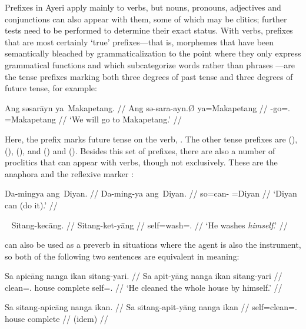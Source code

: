 Prefixes in Ayeri apply mainly to verbs, but nouns, pronouns, adjectives and 
conjunctions can also appear with them, some of which may be clitics; further 
tests need to be performed to determine their exact status.
With verbs, prefixes that are most certainly `true' prefixes---that is, 
morphemes that have been semantically bleached by grammaticalization to the 
point where they only express grammatical functions \citep[157ff.]{lehmann2015} 
and which subcategorize words rather than phrases 
\citep[117]{klavans1985}---are the tense prefixes marking both three degrees of 
past tense and three degrees of future tense, for example:

\ex\begingl
	\gla Ang səsarāyn ya~Makapetang. //
	\glb Ang sə-sara-ayn.Ø ya=Makapetang //
	\glc \AgtT{} \Fut{}-go=\Fpl{}.\Top{} \Loc{}=Makapetang //
	\glft `We will go to Makapetang.' //
\endgl\xe

Here, the prefix  marks future tense on the verb, 
. The other tense prefixes are  
(\NPst{}),  (\Pst{}),  (\RPst{}), and  
(\NFut{}) and  (\RFut{}). Besides this set of prefixes, there are 
also a number of proclitics that can appear with verbs, though not exclusively. 
These are the anaphora  and the 
reflexive marker :

\ex\begingl
	\gla Da-mingya ang~Diyan. //
	\glb Da-ming-ya ang~Diyan. //
	\glc so=can-\TsgM{} \Aarg{}=Diyan //
	\glft `Diyan can (do it).' //
\endgl
% 
\xe

\ex~\begingl
	\gla Sitang-kecāng. //
	\glb Sitang-ket-yāng //
	\glc self=wash=\TsgM{}.\Aarg{} //
	\glft `He washes \emph{himself}.' //
\endgl\xe

 can also be used as a preverb in situations where the 
agent is also the instrument, so both of the following two sentences are 
equivalent in meaning:

\pex
\a\label{ex:sitang+pronoun}\begingl
	\gla Sa apicāng nanga ikan sitang-yari. //
	\glb Sa apit-yāng nanga ikan sitang-yari //
	\glc \PatT{} clean=\Tsg{}.\Aarg{} house complete self=\TsgM{}.\Ins{} //
	\glft `He cleaned the whole house by himself.' //
\endgl

\a\begingl
	\gla Sa sitang-apicāng nanga ikan. //
	\glb Sa sitang-apit-yāng nanga ikan //
	\glc \PatT{} self=clean=\Tsg{}.\Aarg{} house complete //
	\glft (idem) //
\endgl
\xe

